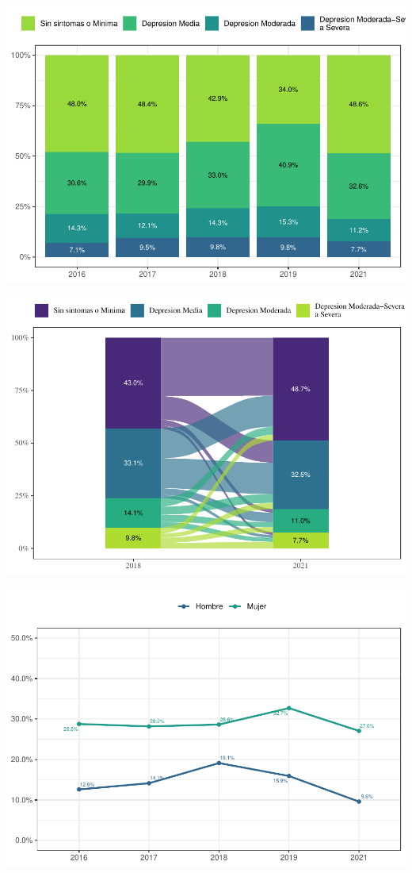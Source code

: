 \documentclass[
  12pt,
]{book}
\begin{document}
\begin{center}\includegraphics{reporte-elsoc_files/figure-latex/depre-wave-1} \end{center}

\begin{center}\includegraphics{reporte-elsoc_files/figure-latex/depre-sexo-1} \end{center}

\begin{center}\includegraphics{reporte-elsoc_files/figure-latex/depre-year-sexo-1} \end{center}
\end{document}
